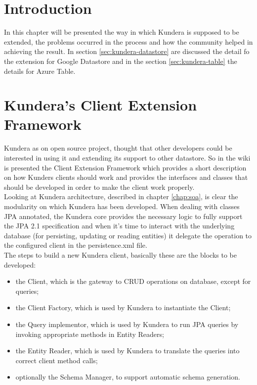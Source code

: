 \section{Introduction}
In this chapter will be presented the way in which Kundera is supposed to be extended, the problems occurred in the process and how the community helped in achieving the result.
In section \ref{sec:kundera-datastore} are discussed the detail fo the extension for Google Datastore and in the section \ref{sec:kundera-table} the details for Azure Table.

\section{Kundera's Client Extension Framework}
Kundera as on open source project, thought that other developers could be interested in using it and extending its support to other datastore.
So in the wiki is presented the Client Extension Framework which provides a short description on how Kunders clients should work and provides the interfaces and classes that should be developed in order to make the client work properly.
\\
Looking at Kundera architecture, described in chapter \ref{chap:soa}, is clear the modularity on which Kundera has been developed. When dealing with classes JPA annotated, the Kundera core provides the necessary logic to fully support the JPA 2.1 specification and when it's time to interact with the underlying database (for persisting, updating or reading entities) it delegate the operation to the configured client in the persistence.xml file.
\\
The steps to build a new Kundera client, basically these are the blocks to be developed:
\begin{itemize}
\item the Client, which is the gateway to CRUD operations on database, except for queries;
\item the Client Factory, which is used by Kundera to instantiate the Client;
\item the Query implementor, which is used by Kundera to run JPA queries by invoking appropriate methods in Entity Readers;
\item the Entity Reader, which is used by Kundera to translate the queries into correct client
method calls;
\item optionally the Schema Manager, to support automatic schema generation.
\end{itemize}

